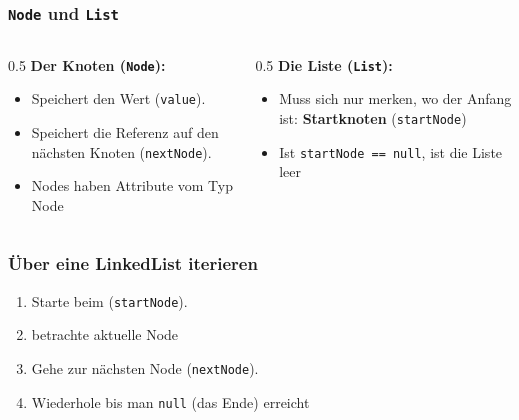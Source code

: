 \documentclass{../../presentation}
\begin{document}
\begin{frame}[fragile]
	\frametitle{ \texttt{Node} und \texttt{List}}
	\begin{columns}
		\begin{column}{0.5\textwidth}
			\textbf{Der Knoten (\texttt{Node}):}
			\begin{itemize}
				\item Speichert den Wert (\texttt{value}).
				\pause
				\item Speichert die Referenz auf den nächsten Knoten (\texttt{nextNode}).
				\pause
				\item Nodes haben Attribute vom Typ Node
			\end{itemize}
		\end{column}
		\pause
		\begin{column}{0.5\textwidth}
			\textbf{Die Liste (\texttt{List}):}
			\begin{itemize}
				\item Muss sich nur merken, wo der Anfang ist: \textbf{Startknoten} (\texttt{startNode})
				\pause
				\item Ist \texttt{startNode == null}, ist die Liste leer
			\end{itemize}
		\end{column}
	\end{columns}
\end{frame}

\begin{frame}[fragile]
	\frametitle{Über eine LinkedList iterieren}
		      \begin{enumerate}
			      \item Starte beim (\texttt{startNode}).
			      \pause
			      \item betrachte aktuelle Node
			      \pause
			      \item Gehe zur nächsten Node (\texttt{nextNode}).
			     \pause 
				  \item Wiederhole bis man \texttt{null} (das Ende) erreicht
		      \end{enumerate}
	\vspace{0.8em}
	\centering
\end{frame}
\end{document}
